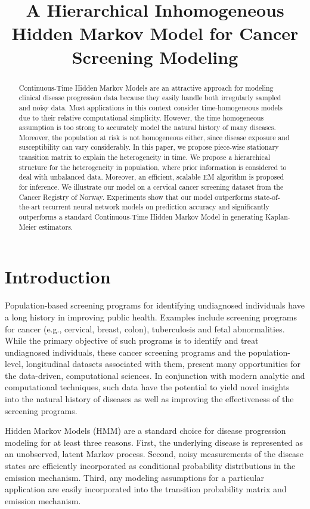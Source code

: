 \documentclass{article}
\title{A Hierarchical Inhomogeneous Hidden Markov Model for Cancer Screening Modeling}
\begin{document}
\maketitle

\begin{abstract}
 Continuous-Time Hidden Markov Models are an attractive approach for modeling clinical disease progression data because they easily handle both irregularly sampled and noisy data. Most applications in this context consider time-homogeneous models due to their relative computational simplicity. However, the time homogeneous assumption is too strong to accurately model the natural history of many diseases. Moreover, the population at risk is not homogeneous either, since disease exposure and susceptibility can vary considerably. In this paper, we propose piece-wise stationary transition matrix to explain the heterogeneity in time. We propose a hierarchical structure for the heterogeneity in population, where prior information is considered to deal with unbalanced data. Moreover, an efficient, scalable EM algorithm is proposed for inference. We illustrate our model on a cervical cancer screening dataset from the Cancer Registry of Norway. Experiments show that our model outperforms state-of-the-art recurrent neural network models on prediction accuracy and significantly outperforms a standard Continuous-Time Hidden Markov Model in generating Kaplan-Meier estimators.
\end{abstract}

\section{Introduction}
Population-based screening programs for identifying undiagnosed individuals have a long history in improving public health. Examples include screening programs for cancer (e.g., cervical, breast, colon), tuberculosis and fetal abnormalities. While the primary objective of such programs is to identify and treat undiagnosed individuals, these cancer screening programs and the population-level, longitudinal datasets associated with them,  present many opportunities for the data-driven, computational sciences. In conjunction with modern analytic and computational techniques, such data have the potential to yield novel insights into the natural history of diseases as well as improving the effectiveness of the screening programs. 

Hidden Markov Models (HMM) are a standard choice for disease progression modeling for at least three reasons. 
First, the underlying disease is represented as an unobserved, latent Markov process. Second, noisy measurements of the disease states are efficiently incorporated as conditional probability distributions in the emission mechanism. Third, any modeling assumptions for a particular application are easily incorporated into the transition probability matrix and emission mechanism.
\end{document}
